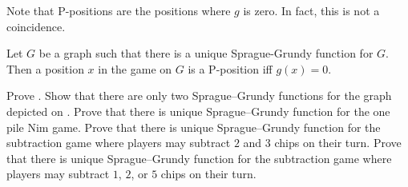 Note that P-positions are the positions where $g$ is zero. In fact,
this is not a coincidence.
\begin{theorem}
\label{theorem:grundy-to-np}
    Let $G$ be a graph such that there is a unique Sprague-Grundy function for
    $G$. Then a position $x$ in the game on $G$ is a P-position iff $g(x) = 0$.
\end{theorem}


\begin{chapterendexercises}
    \exercise Prove .
    \exercise Show that there are only two Sprague--Grundy functions for the
    graph depicted on .
    \exercise Prove that there is unique Sprague--Grundy function for the one pile
        Nim game.
    \exercise Prove that there is unique Sprague--Grundy function for the
        subtraction game where players may subtract $2$ and $3$ chips on their
        turn.
    \exercise
       Prove that there is unique Sprague--Grundy function for the subtraction
       game where players may subtract $1$, $2$, or $5$ chips
       on their turn.
\end{chapterendexercises}
